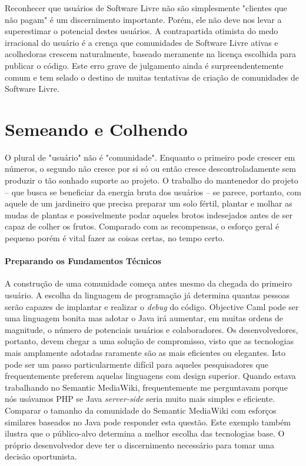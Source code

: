 Reconhecer que usuários de Software Livre não são simplesmente "clientes que não pagam" é
um discernimento importante. Porém, ele não deve nos levar a superestimar o potencial destes
usuários. A contrapartida otimista do medo irracional do usuário é a crença que comunidades
de Software Livre ativas e acolhedoras crescem naturalmente, baseado meramente na licença
escolhida para publicar o código. Este erro grave de julgamento ainda é surpreendentemente
comum e tem selado o destino de muitas tentativas de criação de comunidades de Software Livre.

\section*{Semeando e Colhendo}

O plural de "usuário" não é "comunidade". Enquanto o primeiro pode crescer em números,
o segundo não cresce por si só ou então cresce descontroladamente sem produzir o tão
sonhado suporte ao projeto. O trabalho do mantenedor do projeto -- que busca se beneficiar
da energia bruta dos usuários -- se parece, portanto, com aquele de um jardineiro que precisa
preparar um solo fértil, plantar e molhar as mudas de plantas e possivelmente podar aqueles
brotos indesejados antes de ser capaz de colher os frutos. Comparado com as recompensas, o
esforço geral é pequeno porém é vital fazer as coisas certas, no tempo certo.

\paragraph*{Preparando os Fundamentos Técnicos}
A construção de uma comunidade começa antes mesmo da chegada do primeiro usuário. A escolha
da linguagem de programação já determina quantas pessoas serão capazes de implantar e realizar
o \textit{debug} do código. Objective Caml pode ser uma linguagem bonita mas adotar o Java
irá aumentar, em muitas ordens de magnitude, o número de potenciais usuários e colaboradores.
Os desenvolvedores, portanto, devem chegar a uma solução de compromisso, visto que as tecnologias
mais amplamente adotadas raramente são as mais eficientes ou elegantes. Isto pode ser um passo
particularmente difícil para aqueles pesquisadores que frequentemente preferem aquelas linguagens
com design superior. Quando estava trabalhando no Semantic MediaWiki, frequentemente me perguntavam
porque nós usávamos PHP se Java \textit{server-side} seria muito mais simples e eficiente.
Comparar o tamanho da comunidade do Semantic MediaWiki com esforços similares baseados no Java pode
responder esta questão. Este exemplo também ilustra que o público-alvo determina a melhor escolha
das tecnologias base. O próprio desenvolvedor deve ter o discernimento necessário para tomar uma
decisão oportunista.

